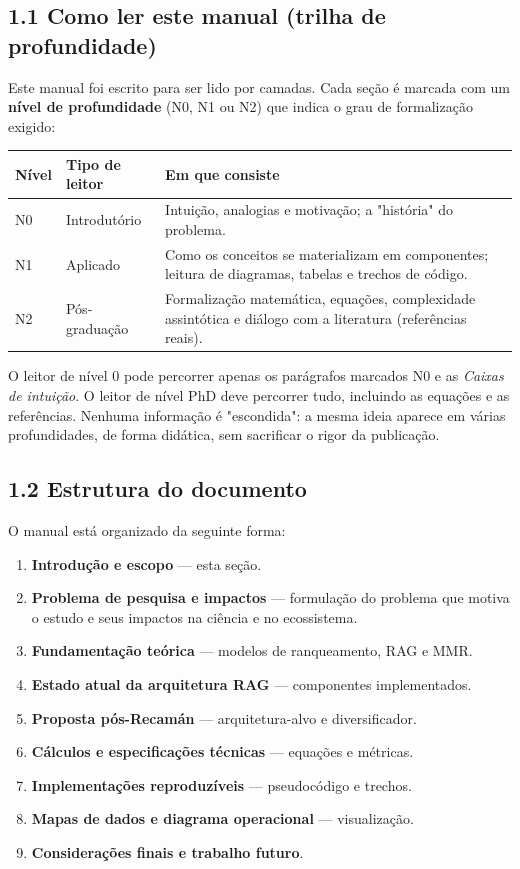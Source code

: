 \subsection*{1.1 Como ler este manual (trilha de profundidade)}

 Este manual foi escrito para ser lido por camadas. Cada seção é
marcada com um \textbf{nível de profundidade} (N0, N1 ou N2) que indica o grau de
formalização exigido:

\begin{center}
\begin{tabularx}{\textwidth}{llX}
\toprule
\textbf{Nível} & \textbf{Tipo de leitor} & \textbf{Em que consiste} \\
\midrule
N0 & Introdutório & Intuição, analogias e motivação; a "história" do problema. \\
N1 & Aplicado & Como os conceitos se materializam em componentes; leitura de
diagramas, tabelas e trechos de código. \\
N2 & Pós-graduação & Formalização matemática, equações, complexidade
assintótica e diálogo com a literatura (referências reais). \\
\bottomrule
\end{tabularx}
\end{center}

\noindent O leitor de nível 0 pode percorrer apenas os parágrafos marcados N0 e
as \emph{Caixas de intuição}. O leitor de nível PhD deve percorrer tudo, incluindo
as equações e as referências. Nenhuma informação é "escondida": a mesma ideia
aparece em várias profundidades, de forma didática, sem sacrificar o rigor da
publicação.

\subsection*{1.2 Estrutura do documento}

O manual está organizado da seguinte forma:

\begin{enumerate}[label=\arabic*.]
  \item \textbf{Introdução e escopo} --- esta seção.
  \item \textbf{Problema de pesquisa e impactos} --- formulação do problema que
        motiva o estudo e seus impactos na ciência e no ecossistema.
  \item \textbf{Fundamentação teórica} --- modelos de ranqueamento, RAG e MMR.
  \item \textbf{Estado atual da arquitetura RAG} --- componentes implementados.
  \item \textbf{Proposta pós-Recamán} --- arquitetura-alvo e diversificador.
  \item \textbf{Cálculos e especificações técnicas} --- equações e métricas.
  \item \textbf{Implementações reproduzíveis} --- pseudocódigo e trechos.
  \item \textbf{Mapas de dados e diagrama operacional} --- visualização.
  \item \textbf{Considerações finais e trabalho futuro}.
\end{enumerate}

